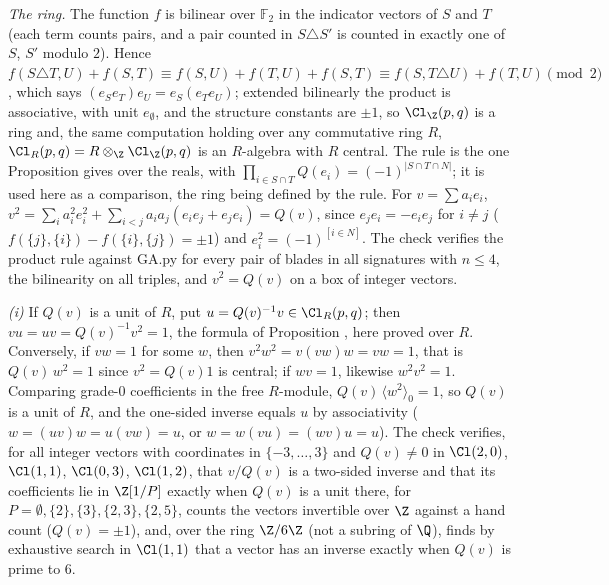 \emph{The ring.} The function $f$ is bilinear over $\mathbb{F}_{2}$ in the indicator vectors of $S$ and $T$ (each term counts pairs, and a pair counted in $S \triangle S'$ is counted in exactly one of $S$, $S'$ modulo $2$). Hence $f(S \triangle T, U) + f(S, T) \equiv f(S, U) + f(T, U) + f(S, T) \equiv f(S, T \triangle U) + f(T, U) \pmod 2$, which says $(e_{S}e_{T})e_{U} = e_{S}(e_{T}e_{U})$; extended bilinearly the product is associative, with unit $e_{\emptyset}$, and the structure constants are $\pm 1$, so $\Cl_{\Z}(p,q)$ is a ring and, the same computation holding over any commutative ring $R$, $\Cl_{R}(p,q) = R \otimes_{\Z}\Cl_{\Z}(p,q)$ is an $R$-algebra with $R$ central. The rule is the one Proposition  gives over the reals, with $\prod_{i \in S \cap T}Q(e_{i}) = (-1)^{|S \cap T \cap N|}$; it is used here as a comparison, the ring being defined by the rule. For $v = \sum a_{i}e_{i}$, $v^{2} = \sum_{i}a_{i}^{2}e_{i}^{2} + \sum_{i < j}a_{i}a_{j}(e_{i}e_{j} + e_{j}e_{i}) = Q(v)$, since $e_{j}e_{i} = -e_{i}e_{j}$ for $i \ne j$ ($f(\{j\}, \{i\}) - f(\{i\}, \{j\}) = \pm 1$) and $e_{i}^{2} = (-1)^{[i \in N]}$. The check verifies the product rule against GA.py for every pair of blades in all signatures with $n \le 4$, the bilinearity on all triples, and $v^{2} = Q(v)$ on a box of integer vectors.

\emph{(i)} If $Q(v)$ is a unit of $R$, put $u = Q(v)^{-1}v \in \Cl_{R}(p,q)$; then $vu = uv = Q(v)^{-1}v^{2} = 1$, the formula of Proposition , here proved over $R$. Conversely, if $vw = 1$ for some $w$, then $v^{2}w^{2} = v(vw)w = vw = 1$, that is $Q(v)\,w^{2} = 1$ since $v^{2} = Q(v)1$ is central; if $wv = 1$, likewise $w^{2}v^{2} = 1$. Comparing grade-$0$ coefficients in the free $R$-module, $Q(v)\,\langle w^{2}\rangle_{0} = 1$, so $Q(v)$ is a unit of $R$, and the one-sided inverse equals $u$ by associativity ($w = (uv)w = u(vw) = u$, or $w = w(vu) = (wv)u = u$). The check verifies, for all integer vectors with coordinates in $\{-3, \dots, 3\}$ and $Q(v) \ne 0$ in $\Cl(2,0)$, $\Cl(1,1)$, $\Cl(0,3)$, $\Cl(1,2)$, that $v/Q(v)$ is a two-sided inverse and that its coefficients lie in $\Z[1/P]$ exactly when $Q(v)$ is a unit there, for $P = \emptyset, \{2\}, \{3\}, \{2,3\}, \{2,5\}$, counts the vectors invertible over $\Z$ against a hand count ($Q(v) = \pm 1$), and, over the ring $\Z/6\Z$ (not a subring of $\Q$), finds by exhaustive search in $\Cl(1,1)$ that a vector has an inverse exactly when $Q(v)$ is prime to $6$.


